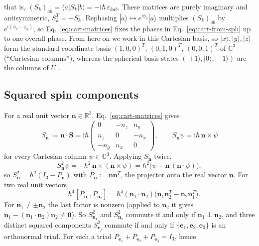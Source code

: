 \documentclass[twocolumn,aps,pra,floatfix,amsmath,amssymb,longbibliography]{revtex4-2}
\newcommand{\ii}{\mathrm{i}}
\newcommand{\C}{\mathbb{C}}
\newcommand{\R}{\mathbb{R}}
\begin{document}
that is, $(S_k)_{ab}=\langle a|S_k|b\rangle=-\ii\hbar\,\varepsilon_{kab}$.  These matrices are purely imaginary and antisymmetric, $S_k^T=-S_k$.  Rephasing $|a\rangle\mapsto e^{\ii\phi_a}|a\rangle$ multiplies $(S_k)_{ab}$ by $e^{\ii(\phi_b-\phi_a)}$, so Eq.~\eqref{eq:cart-matrices} fixes the phases in Eq.~\eqref{eq:cart-from-sph} up to one overall phase.  From here on we work in this Cartesian basis, so $|x\rangle,|y\rangle,|z\rangle$ form the standard coordinate basis $(1,0,0)^T$, $(0,1,0)^T$, $(0,0,1)^T$ of $\C^3$ (``Cartesian columns''), whereas the spherical basis states $(|{+1}\rangle,|0\rangle,|{-1}\rangle)$ are the columns of $U^\dagger$.

\subsection{Squared spin components}
For a real unit vector $\mathbf n\in\R^3$, Eq.~\eqref{eq:cart-matrices} gives
\begin{equation}
 S_{\mathbf n}:=\mathbf n\cdot\mathbf S
 =\ii\hbar\!\begin{pmatrix}
  0 & -n_z & n_y \\
  n_z & 0 & -n_x \\
  -n_y & n_x & 0
 \end{pmatrix}\!,
 \qquad
 S_{\mathbf n}\psi=\ii\hbar\,\mathbf n\times\psi
 \label{eq:Sn}
\end{equation}
for every Cartesian column $\psi\in\C^3$.  Applying $S_{\mathbf n}$ twice,
\begin{equation}
 S_{\mathbf n}^2\psi=-\hbar^2\,\mathbf n\times(\mathbf n\times\psi)
 =\hbar^2\big(\psi-\mathbf n\,(\mathbf n\cdot\psi)\big),
 \label{eq:Sn2-action}
\end{equation}
so $S_{\mathbf n}^2=\hbar^2(I_3-P_{\mathbf n})$ with $P_{\mathbf n}:=\mathbf n\mathbf n^T$, the projector onto the real vector $\mathbf n$.  For two real unit vectors,
\begin{equation}
 [S_{\mathbf n_1}^2,S_{\mathbf n_2}^2]
 =\hbar^4[P_{\mathbf n_1},P_{\mathbf n_2}]
 =\hbar^4(\mathbf n_1\cdot\mathbf n_2)\big(\mathbf n_1\mathbf n_2^T-\mathbf n_2\mathbf n_1^T\big).
 \label{eq:comm-Sn2}
\end{equation}
For $\mathbf n_1\neq\pm\mathbf n_2$ the last factor is nonzero (applied to $\mathbf n_2$ it gives $\mathbf n_1-(\mathbf n_1\cdot\mathbf n_2)\mathbf n_2\neq\mathbf 0$).  So $S_{\mathbf n_1}^2$ and $S_{\mathbf n_2}^2$ commute if and only if $\mathbf n_1\perp\mathbf n_2$, and three distinct squared components $S_{\mathbf e_j}^2$ commute if and only if $\{\mathbf e_1,\mathbf e_2,\mathbf e_3\}$ is an orthonormal triad.  For such a triad $P_{\mathbf e_1}+P_{\mathbf e_2}+P_{\mathbf e_3}=I_3$, hence
\end{document}
